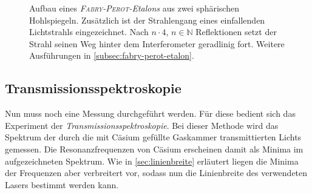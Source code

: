 \documentclass[../bericht.tex]{subfiles}
\begin{document}
        \begin{figure}[ht]
          \caption{Aufbau eines \textit{\textsc{Fabry-Perot}-Etalons} aus zwei sphärischen Hohlspiegeln. Zusätzlich ist der Strahlengang eines einfallenden Lichtstrahls eingezeichnet. Nach $n\cdot 4$, $n\in\mathbb{N}$ Reflektionen setzt der Strahl seinen Weg hinter dem Interferometer geradlinig fort. Weitere Ausführungen in \cref{subsec:fabry-perot-etalon}.}
          \label{fig:fabry-perot-etalon}
        \end{figure}


      \subsection{Transmissionsspektroskopie}
      \label{subsec:transmissionsspektroskopie}

        Nun muss noch eine Messung durchgeführt werden. Für diese bedient sich das Experiment der \textit{Transmissionsspektroskopie}. Bei dieser Methode wird das Spektrum der durch die mit Cäsium gefüllte Gaskammer transmittierten Lichts gemessen. Die Resonanzfrequenzen von Cäsium erscheinen damit als Minima im aufgezeichneten Spektrum. Wie in \cref{sec:linienbreite} erläutert liegen die Minima der Frequenzen aber verbreitert vor, sodass nun die Linienbreite des verwendeten Lasers bestimmt werden kann.
\end{document}
